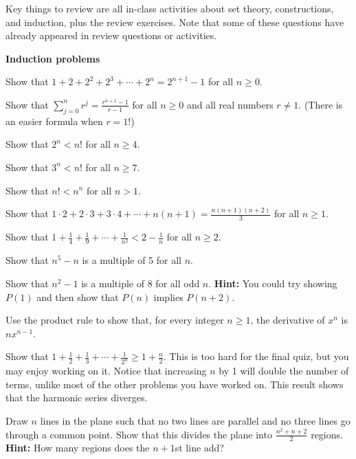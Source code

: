 

Key things to review are all in-class activities about set theory, constructions, and induction, plus the review exercises.
Note that some of these questions have already appeared in review questions or activities.

\vspace{0.2in}

\noindent
{\bf Induction problems}
\blist{0.2in}
\item Show that $1 + 2 + 2^2 + 2^3 + \cdots + 2^n = 2^{n+1} - 1$ for all $n \geq 0$.
\item Show that $\sum_{j=0}^n r^j = \frac{r^{n+1} - 1}{r-1}$ for all $n \geq 0$ and all real numbers $r \ne 1$.  (There is an easier formula when $r = 1!$)
\item Show that $2^n < n!$ for all $n \geq 4$.
\item Show that $3^n < n!$ for all $n \geq 7$.
\item Show that $n! < n^n$ for all $n > 1$.
\item Show that $1\cdot 2 + 2\cdot 3 +3 \cdot 4 + \cdots + n(n+1) = \frac{n(n+1)(n+2)}{3}$ for all $n \geq 1$.
\item Show that $1 + \frac{1}{4} + \frac{1}{9} + \cdots + \frac{1}{n^2} < 2-\frac{1}{n}$ for all $n \geq 2$.
\item Show that $n^5 - n$ is a multiple of 5 for all $n$.
\item Show that $n^2 - 1$ is a multiple of 8 for all odd $n$.
{\bf Hint:} You could try showing $P(1)$ and then show that $P(n)$ implies $P(n+2)$.
\item Use the product rule to show that, for every integer $n \geq 1$, the derivative of $x^n$ is $n x^{n-1}$.
\item Show that $1 + \frac{1}{2} + \frac{1}{3} + \cdots + \frac{1}{2^n} \geq 1 + \frac{n}{2}$.  This is too hard for the final quiz, but you may enjoy working on it.  Notice that increasing $n$ by 1 will double the number of terms, unlike most of the other problems you have worked on.
This result shows that the harmonic series diverges.
\item Draw $n$ lines in the plane such that no two lines are parallel and no three lines go through a common point.
Show that this divides the plane into $\frac{n^2+n+2}{2}$ regions.
{\bf Hint:} How many regions does the $n+1$st line add?
\elist

